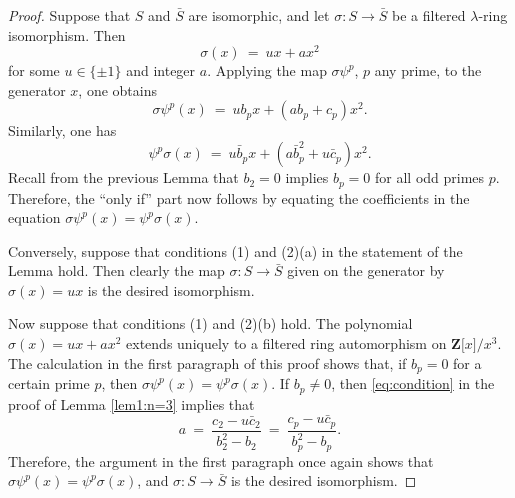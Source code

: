 \documentclass[reqno,11pt]{amsart}
\numberwithin{equation}{subsection}  %
\newcommand{\bZ}{\mathbf{Z}}
\begin{document}
\begin{proof}
Suppose that $S$ and $\bar{S}$ are isomorphic, and let $\sigma \colon S \to \bar{S}$ be a filtered $\lambda$-ring isomorphism.  Then 
   \begin{equation}
   \label{eq:sigma}
   \sigma(x) ~=~ u x + ax^2
   \end{equation}
for some $u \in \lbrace \pm 1 \rbrace$ and integer $a$.  Applying the map $\sigma \psi^p$, $p$ any prime, to the generator $x$, one obtains
   \[
   \sigma\psi^p(x) 
   ~=~ ub_p x + (ab_p + c_p)x^2.
   \]
Similarly, one has
   \[
   \psi^p \sigma(x) ~=~ u\bar{b}_p x + (a\bar{b}_p^2 + u\bar{c}_p)x^2.
   \]
Recall from the previous Lemma that $b_2 = 0$ implies $b_p = 0$ for all odd primes $p$.  Therefore, the ``only if'' part now follows by equating the coefficients in the equation $\sigma \psi^p(x) = \psi^p \sigma(x)$.



Conversely, suppose that conditions (1) and (2)(a) in the statement of the Lemma hold.  Then clearly the map $\sigma \colon S \to \bar{S}$ given on the generator by $\sigma(x) = ux$ is the desired isomorphism.  


Now suppose that conditions (1) and (2)(b) hold.  The polynomial $\sigma(x) =   u x + ax^2$ extends uniquely to a filtered ring automorphism on $\bZ \lbrack x \rbrack/x^3$.  The calculation in the first paragraph of this proof shows that, if $b_p = 0$ for a certain prime $p$, then $\sigma \psi^p(x) = \psi^p \sigma(x)$.  If $b_p \not= 0$, then \eqref{eq:condition} in the proof of Lemma \ref{lem1:n=3} implies that
   \[
   a ~=~ \dfrac{c_2 - u \bar{c}_2}{b_2^2 - b_2}
     ~=~ \dfrac{c_p - u \bar{c}_p}{b_p^2 - b_p}.
   \]
Therefore, the argument in the first paragraph once again shows that $\sigma \psi^p(x) = \psi^p \sigma(x)$, and $\sigma \colon S \to \bar{S}$ is the desired isomorphism.
\end{proof}
\end{document}
